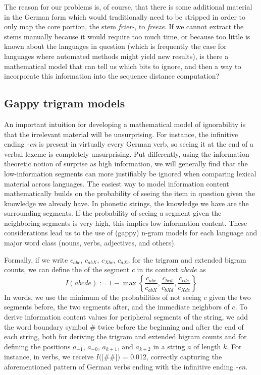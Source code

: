 The reason for our problems is, of course, that there is some additional material in the German form which would traditionally need to be stripped in order to only map the core portion, the stem \textit{frier-}, to \textit{freeze}. If we cannot extract the stems manually because it would require too much time, or because too little is known about the languages in question (which is frequently the case for languages where automated methods might yield new results), is there a mathematical model that can tell us which bits to ignore, and then a way to incorporate this information into the sequence distance computation?

\subsection{Gappy trigram models}
An important intuition for developing a mathematical model of ignorability is that the irrelevant material will be unsurprising. For instance, the infinitive ending \textit{-en} is present in virtually every German verb, so seeing it at the end of a verbal lexeme is completely unsurprising. Put differently, using the information-theoretic notion of surprise as high information, we will generally find that the low-information segments can more justifiably be ignored when comparing lexical material across languages. The easiest way to model information content mathematically builds on the probability of seeing the item in question given the knowledge we already have. In phonetic strings, the knowledge we have are the surrounding segments. If the probability of seeing a segment given the neighboring segments is very high, this implies low information content. These considerations lead us to the use of (gappy) n-gram models for each language and major word class (nouns, verbs, adjectives, and others).

Formally, if we write $c_{abc}$, $c_{abX}$, $c_{Xbc}$, $c_{aXc}$ for the trigram and extended bigram counts, we can define the \textit{} of the segment $c$ in its context $abcde$ as 
\begin{equation}
  I(abcde) := 1 - \max\left \{\frac{c_{abc}}{c_{abX}}, \frac{c_{bcd}}{c_{bXd}}, \frac{c_{cde}}{c_{Xde}} \right \}
\end{equation}
In words, we use the minimum of the probabilities of not seeing $c$ given the two segments before, the two segments after, and the immediate neighbors of $c$. To derive information content values for peripheral segments of the string, we add the word boundary symbol $\#$ twice before the beginning and after the end of each string, both for deriving the trigram and extended bigram counts and for defining the positions $a_{-1}$, $a_{-0}$, $a_{k+1}$, and $a_{k+2}$ in a string $a$ of length $k$. For instance, in  verbs, we receive $I($[\#\#]$)$ = 0.012, correctly capturing the aforementioned pattern of German verbs ending with the infinitive ending \textit{-en}.

